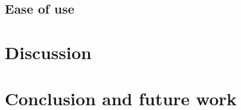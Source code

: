 \documentclass[11pt, a4paper,oneside,chapterprefix=false]{scrbook}
\begin{document}
\section{Ease of use} \label{sec:convenience}




\chapter{Discussion} \label{chp:discussion}

\chapter{Conclusion and future work} \label{chp:conclusion}



\end{document}
